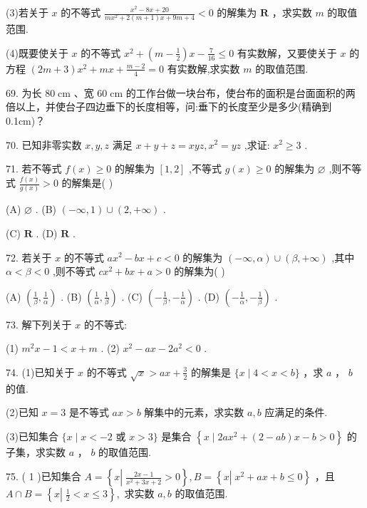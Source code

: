 \documentclass[10pt]{article}
\begin{document}
(3)若关于 \(x\) 的不等式 \(\frac{{x}^{2} - {8x} + {20}}{m{x}^{2} + 2\left( {m + 1}\right) x + {9m} + 4} < 0\) 的解集为 \(\mathbf{R}\) ，求实数 \(m\) 的取值范围.

(4)既要使关于 \(x\) 的不等式 \({x}^{2} + \left( {m - \frac{1}{2}}\right) x - \frac{7}{16} \leq  0\) 有实数解，又要使关于 \(x\) 的方程 \(\left( {{2m} + 3}\right) {x}^{2} + {mx} + \frac{m - 2}{4} = 0\) 有实数解,求实数 \(m\) 的取值范围.

69. 为长 \({80}\mathrm{\;{cm}}\) 、宽 \({60}\mathrm{\;{cm}}\) 的工作台做一块台布，使台布的面积是台面面积的两倍以上，并使台子四边垂下的长度相等，问:垂下的长度至少是多少(精确到 0.1cm)？

70. 已知非零实数 \(x,y,z\) 满足 \(x + y + z = {xyz},{x}^{2} = {yz}\) ,求证: \({x}^{2} \geq  3\) .

71. 若不等式 \(f\left( x\right)  \geq  0\) 的解集为 \(\left\lbrack  {1,2}\right\rbrack\) ,不等式 \(g\left( x\right)  \geq  0\) 的解集为 \(\varnothing\) ,则不等式 \(\frac{f\left( x\right) }{g\left( x\right) } > 0\) 的解集是( )

(A) \(\varnothing\) . (B) \(\left( {-\infty ,1}\right)  \cup  \left( {2, + \infty }\right)\) .

(C) \(\mathbf{R}\) . (D) \(\mathbf{R}\) .

72. 若关于 \(x\) 的不等式 \(a{x}^{2} - {bx} + c < 0\) 的解集为 \(\left( {-\infty ,\alpha }\right)  \cup  \left( {\beta , + \infty }\right)\) ,其中 \(\alpha  < \beta  < 0\) ,则不等式 \(c{x}^{2} + {bx} + a > 0\) 的解集为( )

(A) \(\left( {\frac{1}{\beta },\frac{1}{\alpha }}\right)\) . (B) \(\left( {\frac{1}{\alpha },\frac{1}{\beta }}\right)\) . (C) \(\left( {-\frac{1}{\beta }, - \frac{1}{\alpha }}\right)\) . (D) \(\left( {-\frac{1}{\alpha }, - \frac{1}{\beta }}\right)\) .

73. 解下列关于 \(x\) 的不等式:

(1) \({m}^{2}x - 1 < x + m\) . (2) \({x}^{2} - {ax} - 2{a}^{2} < 0\) .

74. (1)已知关于 \(x\) 的不等式 \(\sqrt{x} > {ax} + \frac{3}{2}\) 的解集是 \(\{ x \mid  4 < x < b\}\) ，求 \(a\) ， \(b\) 的值.

(2)已知 \(x = 3\) 是不等式 \({ax} > b\) 解集中的元素，求实数 \(a,b\) 应满足的条件.

(3)已知集合 \(\{ x \mid  x <  - 2\) 或 \(x > 3\}\) 是集合 \(\left\{  {x \mid  {2a}{x}^{2} + \left( {2 - {ab}}\right) x - {b > 0}}\right\}\) 的子集，求实数 \(a\) ， \(b\) 的取值范围.

75. ( 1 )已知集合 \(A = \left\{  {x\left| {\;\frac{{2x} - 1}{{x}^{2} + {3x} + 2} > 0}\right. }\right\}  ,B = \left\{  {x\left| {\;{x}^{2} + {ax} + b \leq  0}\right. }\right\}\) ，且 \(A \cap  B = \left\{  {x\left| {\;\frac{1}{2} < x \leq  3}\right. }\right\}  ,\) 求实数 \(a,b\) 的取值范围.
\end{document}
